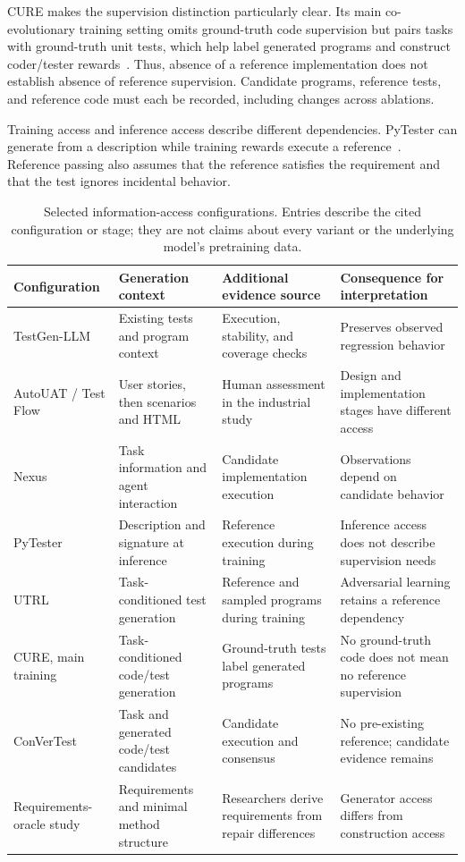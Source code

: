 CURE makes the supervision distinction particularly clear. Its main co-evolutionary training setting omits ground-truth code supervision but pairs tasks with ground-truth unit tests, which help label generated programs and construct coder/tester rewards~\cite{T14}. Thus, absence of a reference implementation does not establish absence of reference supervision. Candidate programs, reference tests, and reference code must each be recorded, including changes across ablations.

Training access and inference access describe different dependencies. PyTester can generate from a description while training rewards execute a reference~\cite{T01}. Reference passing also assumes that the reference satisfies the requirement and that the test ignores incidental behavior.

\begin{table}[t]
\caption{Selected information-access configurations. Entries describe the cited configuration or stage; they are not claims about every variant or the underlying model's pretraining data.}
\label{tab:access}
\small
\begin{tabularx}{\linewidth}{@{}>{\raggedright\arraybackslash}p{.19\linewidth}YYY@{}}
\toprule
Configuration & Generation context & Additional evidence source & Consequence for interpretation \\
\midrule
TestGen-LLM~\cite{U07} & Existing tests and program context & Execution, stability, and coverage checks & Preserves observed regression behavior \\
AutoUAT / Test Flow~\cite{R03} & User stories, then scenarios and HTML & Human assessment in the industrial study & Design and implementation stages have different access \\
Nexus~\cite{O03} & Task information and agent interaction & Candidate implementation execution & Observations depend on candidate behavior \\
PyTester~\cite{T01} & Description and signature at inference & Reference execution during training & Inference access does not describe supervision needs \\
UTRL~\cite{T02} & Task-conditioned test generation & Reference and sampled programs during training & Adversarial learning retains a reference dependency \\
CURE, main training~\cite{T14} & Task-conditioned code/test generation & Ground-truth tests label generated programs & No ground-truth code does not mean no reference supervision \\
ConVerTest~\cite{O10} & Task and generated code/test candidates & Candidate execution and consensus & No pre-existing reference; candidate evidence remains \\
Requirements-oracle study~\cite{O12} & Requirements and minimal method structure & Researchers derive requirements from repair differences & Generator access differs from construction access \\
\bottomrule
\end{tabularx}
\end{table}

